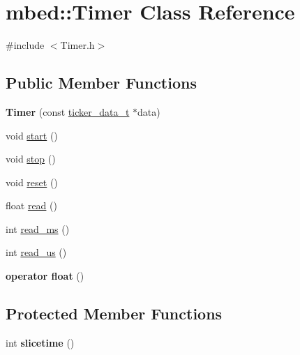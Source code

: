 \hypertarget{classmbed_1_1_timer}{}\section{mbed\+:\+:Timer Class Reference}
\label{classmbed_1_1_timer}


{\ttfamily \#include $<$Timer.\+h$>$}

\subsection*{Public Member Functions}
\begin{DoxyCompactItemize}
\item 
{\bfseries Timer} (const \hyperlink{structticker__data__t}{ticker\+\_\+data\+\_\+t} $\ast$data)\hypertarget{classmbed_1_1_timer_aa660af6717dea877c88df8c3b9444de7}{}\label{classmbed_1_1_timer_aa660af6717dea877c88df8c3b9444de7}

\item 
void \hyperlink{classmbed_1_1_timer_aa9e4096c9e6a416f42e0ae3a85604caa}{start} ()
\item 
void \hyperlink{classmbed_1_1_timer_a4a687e8a871c6fd29d4b74bdef3c52a2}{stop} ()
\item 
void \hyperlink{classmbed_1_1_timer_a6b7f2334eb9533efb72fc29314f4fa02}{reset} ()
\item 
float \hyperlink{classmbed_1_1_timer_a121d69d1b058f0ac809dea2df5143bfc}{read} ()
\item 
int \hyperlink{classmbed_1_1_timer_a2bc063758527437192a555b35ca73d6c}{read\+\_\+ms} ()
\item 
int \hyperlink{classmbed_1_1_timer_a97735f708d71171d2905df675dc64091}{read\+\_\+us} ()
\item 
{\bfseries operator float} ()\hypertarget{classmbed_1_1_timer_a10b28607779c2ef84f880577fe13209f}{}\label{classmbed_1_1_timer_a10b28607779c2ef84f880577fe13209f}

\end{DoxyCompactItemize}
\subsection*{Protected Member Functions}
\begin{DoxyCompactItemize}
\item 
int {\bfseries slicetime} ()\hypertarget{classmbed_1_1_timer_aed61c2655fe5ac72eb0231e4e2bdb480}{}\label{classmbed_1_1_timer_aed61c2655fe5ac72eb0231e4e2bdb480}

\end{DoxyCompactItemize}
